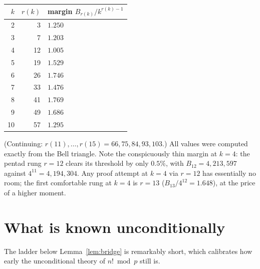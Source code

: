 \documentclass[11pt]{article}
\theoremstyle{definition}
\theoremstyle{remark}
\begin{document}
\begin{center}
\begin{tabular}{rrl}
\toprule
$k$ & $r(k)$ & margin $B_{r(k)}/k^{r(k)-1}$ \\
\midrule
 2 &  3 & $1.250$ \\
 3 &  7 & $1.203$ \\
 4 & 12 & $1.005$ \\
 5 & 19 & $1.529$ \\
 6 & 26 & $1.746$ \\
 7 & 33 & $1.476$ \\
 8 & 41 & $1.769$ \\
 9 & 49 & $1.686$ \\
10 & 57 & $1.295$ \\
\bottomrule
\end{tabular}
\end{center}

(Continuing: $r(11), \dots, r(15) = 66, 75, 84, 93, 103$.) All values were
computed exactly from the Bell triangle. Note the conspicuously thin margin
at $k = 4$: the pentad rung $r = 12$ clears its threshold by only $0.5\%$,
with $B_{12} = 4{,}213{,}597$ against $4^{11} = 4{,}194{,}304$. Any proof
attempt at $k = 4$ via $r = 12$ has essentially no room; the first
comfortable rung at $k = 4$ is $r = 13$
($B_{13}/4^{12} = 1.648$), at the price of a higher moment.

\section{What is known unconditionally}

The ladder below Lemma~\ref{lem:bridge} is remarkably short, which
calibrates how early the unconditional theory of $n! \bmod p$ still is.
\end{document}
